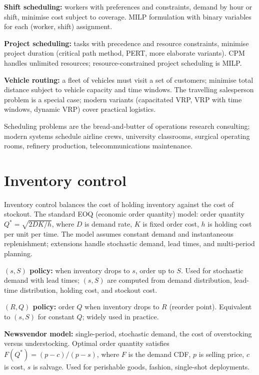\textbf{Shift scheduling:} workers with preferences and constraints, demand by hour or shift, minimise cost subject to coverage. MILP formulation with binary variables for each (worker, shift) assignment.

\textbf{Project scheduling:} tasks with precedence and resource constraints, minimise project duration (critical path method, PERT, more elaborate variants). CPM handles unlimited resources; resource-constrained project scheduling is MILP.

\textbf{Vehicle routing:} a fleet of vehicles must visit a set of customers; minimise total distance subject to vehicle capacity and time windows. The travelling salesperson problem is a special case; modern variants (capacitated VRP, VRP with time windows, dynamic VRP) cover practical logistics.

Scheduling problems are the bread-and-butter of operations research consulting; modern systems schedule airline crews, university classrooms, surgical operating rooms, refinery production, telecommunications maintenance.

\section{Inventory control}

Inventory control balances the cost of holding inventory against the cost of stockout. The standard EOQ (economic order quantity) model: order quantity $Q^* = \sqrt{2 D K / h}$, where $D$ is demand rate, $K$ is fixed order cost, $h$ is holding cost per unit per time. The model assumes constant demand and instantaneous replenishment; extensions handle stochastic demand, lead times, and multi-period planning.

\textbf{$(s, S)$ policy:} when inventory drops to $s$, order up to $S$. Used for stochastic demand with lead times; $(s, S)$ are computed from demand distribution, lead-time distribution, holding cost, and stockout cost.

\textbf{$(R, Q)$ policy:} order $Q$ when inventory drops to $R$ (reorder point). Equivalent to $(s, S)$ for constant $Q$; widely used in practice.

\textbf{Newsvendor model:} single-period, stochastic demand, the cost of overstocking versus understocking. Optimal order quantity satisfies $F(Q^*) = (p - c)/(p - s)$, where $F$ is the demand CDF, $p$ is selling price, $c$ is cost, $s$ is salvage. Used for perishable goods, fashion, single-shot deployments.

